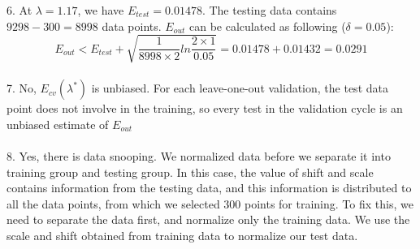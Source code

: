 \documentclass[12pt]{article}
\begin{document}
6. At $\lambda=1.17$, we have $E_{test}=0.01478$. The testing data contains $9298-300=8998$ data points. $E_{out}$ can be calculated as following ($\delta=0.05$):
$$E_{out}<E_{test}+\sqrt{\frac{1}{8998\times 2}ln\frac{2\times 1}{0.05}}=0.01478+0.01432=0.0291$$\\
7. No, $E_{cv}(\lambda^*)$ is unbiased. For each leave-one-out validation, the test data point does not involve in the training, so every test in the validation cycle is an unbiased estimate of $E_{out}$\\\\
8. Yes, there is data snooping. We normalized data before we separate it into training group and testing group. In this case, the value of shift and scale contains information from the testing data, and this information is distributed to all the data points, from which we selected 300 points for training. To fix this, we need to separate the data first, and normalize only the training data. We use the scale and shift obtained from training data to normalize our test data.  
\end{document}
